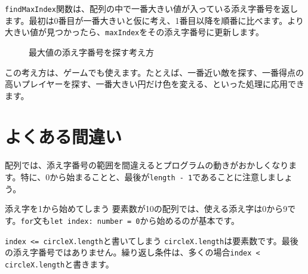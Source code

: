 \texttt{findMaxIndex}関数は、配列の中で一番大きい値が入っている添え字番号を返します。最初は0番目が一番大きいと仮に考え、1番目以降を順番に比べます。より大きい値が見つかったら、\texttt{maxIndex}をその添え字番号に更新します。

\begin{figure}[htbp]
    \centering
    \caption{最大値の添え字番号を探す考え方}
    \label{fig:chapter10-find-max-index}
\end{figure}

この考え方は、ゲームでも使えます。たとえば、一番近い敵を探す、一番得点の高いプレイヤーを探す、一番大きい円だけ色を変える、といった処理に応用できます。

\section{よくある間違い}

配列では、添え字番号の範囲を間違えるとプログラムの動きがおかしくなります。特に、0から始まることと、最後が\texttt{length - 1}であることに注意しましょう。

\begin{mistakebox}{添え字を1から始めてしまう}
要素数が10の配列では、使える添え字は0から9です。\texttt{for}文も\texttt{let index: number = 0}から始めるのが基本です。
\end{mistakebox}

\begin{mistakebox}{\texttt{index <= circleX.length}と書いてしまう}
\texttt{circleX.length}は要素数です。最後の添え字番号ではありません。繰り返し条件は、多くの場合\texttt{index < circleX.length}と書きます。
\end{mistakebox}

